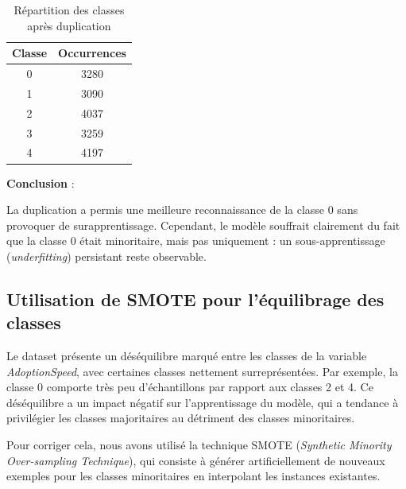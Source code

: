\documentclass[a4paper,12pt]{article}
\begin{document}
\begin{table}[h]

\centering

\begin{tabular}{|c|c|}

\hline

\textbf{Classe} & \textbf{Occurrences} \\ \hline

0 & 3280 \\ \hline

1 & 3090 \\ \hline

2 & 4037 \\ \hline

3 & 3259 \\ \hline

4 & 4197 \\ \hline

\end{tabular}

\caption{Répartition des classes après duplication}

\end{table}
 
\bigskip
 
\textbf{Conclusion} :  

La duplication a permis une meilleure reconnaissance de la classe 0 sans provoquer de surapprentissage. Cependant, le modèle souffrait clairement du fait que la classe 0 était minoritaire, mais pas uniquement : un sous-apprentissage (\textit{underfitting}) persistant reste observable.
 
\subsection{Utilisation de SMOTE pour l'équilibrage des classes}
 
Le dataset présente un déséquilibre marqué entre les classes de la variable \textit{AdoptionSpeed}, avec certaines classes nettement surreprésentées. Par exemple, la classe 0 comporte très peu d'échantillons par rapport aux classes 2 et 4. Ce déséquilibre a un impact négatif sur l’apprentissage du modèle, qui a tendance à privilégier les classes majoritaires au détriment des classes minoritaires.
 
Pour corriger cela, nous avons utilisé la technique SMOTE (\textit{Synthetic Minority Over-sampling Technique}), qui consiste à générer artificiellement de nouveaux exemples pour les classes minoritaires en interpolant les instances existantes.
 
\end{document}
